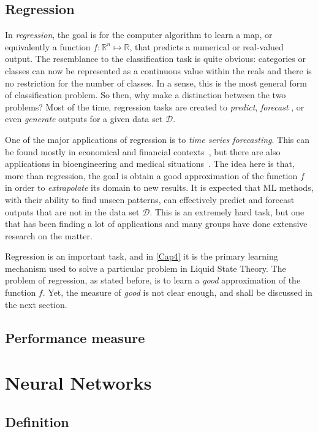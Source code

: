 \subsection{Regression}
In \emph{regression}, the goal is for the computer algorithm to learn a map, or 
equivalently a function $f \colon \mathbb{R}^n \mapsto \mathbb{R}$, that predicts a 
numerical or real-valued output. The resemblance to the classification task is quite 
obvious: categories or classes can now be represented as a continuous value within the 
reals and there is no restriction for the number of classes. In a sense, this is the most 
general form of classification problem. So then, why make a distinction between the two 
problems? Most of the time, regression tasks are created to \emph{predict}, \emph{forecast}
, or even \emph{generate} outputs for a given data set $\mathcal{D}$.

One of the major applications of regression is to \emph{time series forecasting}. This can 
be found mostly in economical and financial contexts~\cite{bontempiMachineLearningStrategies2013,sezerFinancialTimeSeries2020}, but there are also 
applications in bioengineering and medical situations~\cite{mccoyAssessmentTimeSeriesMachine2018}. The idea here is that, more than regression, the 
goal is obtain a good approximation of the function $f$ in order to \emph{extrapolate} its 
domain to new results. It is expected that ML methods, with their ability to find unseen 
patterns, can effectively predict and forecast outputs that are not in the data set 
$\mathcal{D}$. This is an extremely hard task, but one that has been finding a lot of 
applications and many groups have done extensive research on the matter.

Regression is an important task, and in \autoref{Cap4} it is the primary learning mechanism 
used to solve a particular problem in Liquid State Theory. The problem of regression, as 
stated before, is to learn a \emph{good} approximation of the function $f$. Yet, the 
measure of \emph{good} is not clear enough, and shall be discussed in the next section.

\subsection{Performance measure}

\section{Neural Networks}
\subsection{Definition}
